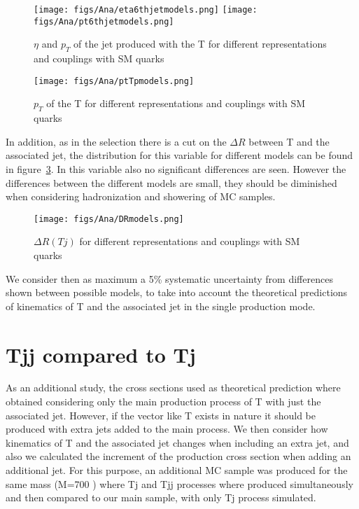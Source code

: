 \begin{figure}[!hbtp]
  \begin{center}
    \texttt{[image: figs/Ana/eta6thjetmodels.png]}
    \texttt{[image: figs/Ana/pt6thjetmodels.png]}
    \caption{$\eta$ and $p_{T}$ of the jet produced with the T for different representations and couplings with SM quarks}
    \label{fig:accomjet}
  \end{center}
\end{figure}

\begin{figure}[!hbtp]
  \begin{center}
    \texttt{[image: figs/Ana/ptTpmodels.png]}
    \caption{$p_{T}$ of the T for different representations and couplings with SM quarks}
    \label{fig:Tppt}
  \end{center}
\end{figure}

In addition, as in the selection there is a cut on the $\Delta R$ between T and the associated jet, the distribution for this variable for different models can be found in figure~\ref{fig:DRmodels}. In this variable also no significant differences are seen. However the differences between the different models are small, they should be diminished when considering hadronization and showering of MC samples.

\begin{figure}[!hbtp]
  \begin{center}
    \texttt{[image: figs/Ana/DRmodels.png]}
    \caption{$\Delta R (Tj)$ for different representations and couplings with SM quarks}
    \label{fig:DRmodels}
  \end{center}
\end{figure}

We consider then as maximum a 5\% systematic uncertainty from differences shown between possible models, to take into account the theoretical predictions of kinematics of T and the associated jet in the single production mode.

\section{Tjj compared to Tj}

As an additional study, the cross sections used as theoretical prediction where obtained considering only the main production process of T with just the associated jet. However, if the vector like T exists in nature it should be produced with extra jets added to the main process. We then consider how kinematics of T and the associated jet changes when including an extra jet, and also we calculated the increment of the production cross section when adding an additional jet. For this purpose, an additional MC sample was produced for the same mass (M=700 \GeVcc) where Tj and Tjj processes where produced simultaneously and then compared to our main sample, with only Tj process simulated.

